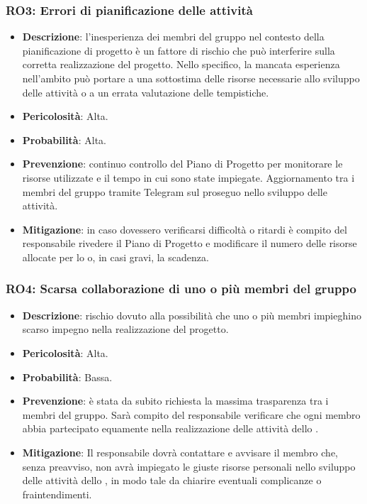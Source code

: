 \subsubsection{RO3: Errori di pianificazione delle attività}
\begin{itemize}
    \item \textbf{Descrizione}: l'inesperienza dei membri del gruppo nel contesto della pianificazione di progetto è un fattore di rischio che può interferire sulla corretta realizzazione del progetto. 
    Nello specifico, la mancata esperienza nell'ambito può portare a una sottostima delle risorse necessarie allo sviluppo delle attività o a un errata valutazione delle tempistiche. 
    \item \textbf{Pericolosità}: Alta.
    \item \textbf{Probabilità}: Alta.
    \item \textbf{Prevenzione}: continuo controllo del Piano di Progetto per monitorare le risorse utilizzate e il tempo in cui sono state impiegate.
    Aggiornamento tra i membri del gruppo tramite Telegram sul proseguo nello sviluppo delle attività.
    \item \textbf{Mitigazione}: in caso dovessero verificarsi difficoltà o ritardi è compito del responsabile rivedere il Piano di Progetto e modificare il numero delle risorse allocate per lo  o, in casi gravi, la scadenza.
\end{itemize}

\subsubsection{RO4: Scarsa collaborazione di uno o più membri del gruppo}
\begin{itemize}
    \item \textbf{Descrizione}: rischio dovuto alla possibilità che uno o più membri impieghino scarso impegno nella realizzazione del progetto.
    \item \textbf{Pericolosità}: Alta.
    \item \textbf{Probabilità}: Bassa.
    \item \textbf{Prevenzione}: è stata da subito richiesta la massima trasparenza tra i membri del gruppo.
    Sarà compito del responsabile verificare che ogni membro abbia partecipato equamente nella realizzazione delle attività dello .
    \item \textbf{Mitigazione}: Il responsabile dovrà contattare e avvisare il membro che, senza preavviso, non avrà impiegato le giuste risorse personali nello sviluppo delle attività dello , in modo tale da chiarire eventuali complicanze o fraintendimenti. 
\end{itemize}

